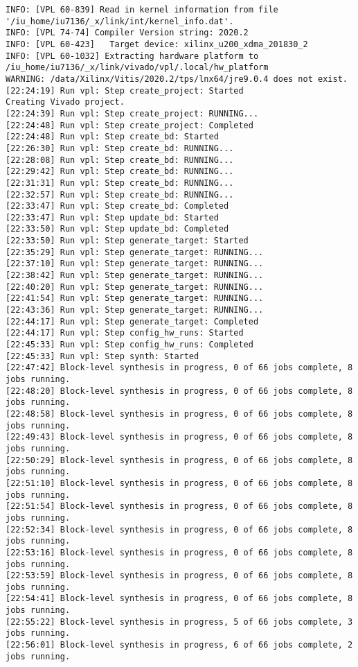 \begin{lstlisting}[label=lst:code_2,caption=Содержимое файла  v++*.log]
INFO: [VPL 60-839] Read in kernel information from file '/iu_home/iu7136/_x/link/int/kernel_info.dat'.
INFO: [VPL 74-74] Compiler Version string: 2020.2
INFO: [VPL 60-423]   Target device: xilinx_u200_xdma_201830_2
INFO: [VPL 60-1032] Extracting hardware platform to /iu_home/iu7136/_x/link/vivado/vpl/.local/hw_platform
WARNING: /data/Xilinx/Vitis/2020.2/tps/lnx64/jre9.0.4 does not exist.
[22:24:19] Run vpl: Step create_project: Started
Creating Vivado project.
[22:24:39] Run vpl: Step create_project: RUNNING...
[22:24:48] Run vpl: Step create_project: Completed
[22:24:48] Run vpl: Step create_bd: Started
[22:26:30] Run vpl: Step create_bd: RUNNING...
[22:28:08] Run vpl: Step create_bd: RUNNING...
[22:29:42] Run vpl: Step create_bd: RUNNING...
[22:31:31] Run vpl: Step create_bd: RUNNING...
[22:32:57] Run vpl: Step create_bd: RUNNING...
[22:33:47] Run vpl: Step create_bd: Completed
[22:33:47] Run vpl: Step update_bd: Started
[22:33:50] Run vpl: Step update_bd: Completed
[22:33:50] Run vpl: Step generate_target: Started
[22:35:29] Run vpl: Step generate_target: RUNNING...
[22:37:10] Run vpl: Step generate_target: RUNNING...
[22:38:42] Run vpl: Step generate_target: RUNNING...
[22:40:20] Run vpl: Step generate_target: RUNNING...
[22:41:54] Run vpl: Step generate_target: RUNNING...
[22:43:36] Run vpl: Step generate_target: RUNNING...
[22:44:17] Run vpl: Step generate_target: Completed
[22:44:17] Run vpl: Step config_hw_runs: Started
[22:45:33] Run vpl: Step config_hw_runs: Completed
[22:45:33] Run vpl: Step synth: Started
[22:47:42] Block-level synthesis in progress, 0 of 66 jobs complete, 8 jobs running.
[22:48:20] Block-level synthesis in progress, 0 of 66 jobs complete, 8 jobs running.
[22:48:58] Block-level synthesis in progress, 0 of 66 jobs complete, 8 jobs running.
[22:49:43] Block-level synthesis in progress, 0 of 66 jobs complete, 8 jobs running.
[22:50:29] Block-level synthesis in progress, 0 of 66 jobs complete, 8 jobs running.
[22:51:10] Block-level synthesis in progress, 0 of 66 jobs complete, 8 jobs running.
[22:51:54] Block-level synthesis in progress, 0 of 66 jobs complete, 8 jobs running.
[22:52:34] Block-level synthesis in progress, 0 of 66 jobs complete, 8 jobs running.
[22:53:16] Block-level synthesis in progress, 0 of 66 jobs complete, 8 jobs running.
[22:53:59] Block-level synthesis in progress, 0 of 66 jobs complete, 8 jobs running.
[22:54:41] Block-level synthesis in progress, 0 of 66 jobs complete, 8 jobs running.
[22:55:22] Block-level synthesis in progress, 5 of 66 jobs complete, 3 jobs running.
[22:56:01] Block-level synthesis in progress, 6 of 66 jobs complete, 2 jobs running.

\end{lstlisting}
